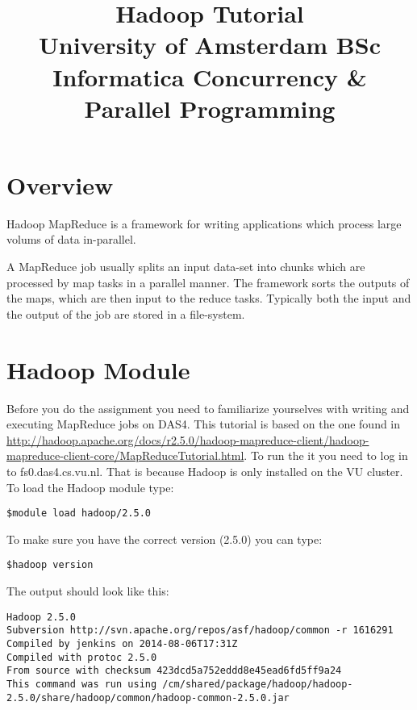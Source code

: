 \documentclass[a4paper,10pt]{article}
\date{}
\title{Hadoop Tutorial\\
University of Amsterdam BSc Informatica
Concurrency \& Parallel Programming
}
\begin{document}
\maketitle

\tableofcontents

\section{Overview}


Hadoop MapReduce is a framework for writing applications which process large volums of data in-parallel.

A MapReduce job usually splits an input data-set into chunks which are processed by map tasks in a parallel manner. The framework sorts the outputs of the maps, which are then input to the reduce tasks. Typically both the input and the output of the job are stored in a file-system.


\section{Hadoop Module}

Before you do the assignment you need to familiarize yourselves with writing and executing MapReduce jobs on DAS4. This tutorial is based on the one found in \url{http://hadoop.apache.org/docs/r2.5.0/hadoop-mapreduce-client/hadoop-mapreduce-client-core/MapReduceTutorial.html}. 
To run the it you need to log in to fs0.das4.cs.vu.nl. That is because Hadoop is only installed on the VU cluster. To load the Hadoop module type: 

\lstset{language=}

\begin{lstlisting}
$module load hadoop/2.5.0 
\end{lstlisting}

To make sure you have the correct version (2.5.0) you can type:
\begin{lstlisting}
$hadoop version
\end{lstlisting}

The output should look like this: 
\begin{lstlisting}
Hadoop 2.5.0
Subversion http://svn.apache.org/repos/asf/hadoop/common -r 1616291
Compiled by jenkins on 2014-08-06T17:31Z
Compiled with protoc 2.5.0
From source with checksum 423dcd5a752eddd8e45ead6fd5ff9a24
This command was run using /cm/shared/package/hadoop/hadoop-2.5.0/share/hadoop/common/hadoop-common-2.5.0.jar
\end{lstlisting}
\end{document}
